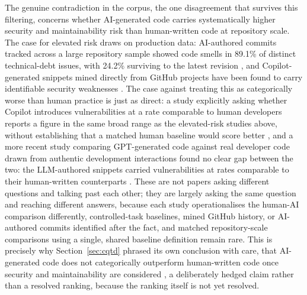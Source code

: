 The genuine contradiction in the corpus, the one disagreement that survives this filtering, concerns whether AI-generated code carries systematically higher security and maintainability risk than human-written code at repository scale. The case for elevated risk draws on production data: AI-authored commits tracked across a large repository sample showed code smells in 89.1\% of distinct technical-debt issues, with 24.2\% surviving to the latest revision \cite{liu_debt_2026}, and Copilot-generated snippets mined directly from GitHub projects have been found to carry identifiable security weaknesses \cite{fu_security_2025}. The case against treating this as categorically worse than human practice is just as direct: a study explicitly asking whether Copilot introduces vulnerabilities at a rate comparable to human developers reports a figure in the same broad range as the elevated-risk studies above, without establishing that a matched human baseline would score better \cite{asare_is_2024}, and a more recent study comparing GPT-generated code against real developer code drawn from authentic development interactions found no clear gap between the two: the LLM-authored snippets carried vulnerabilities at rates comparable to their human-written counterparts \cite{belozerov_secure_2026}. These are not papers asking different questions and talking past each other; they are largely asking the same question and reaching different answers, because each study operationalises the human-AI comparison differently, controlled-task baselines, mined GitHub history, or AI-authored commits identified after the fact, and matched repository-scale comparisons using a single, shared baseline definition remain rare. This is precisely why Section~\ref{sec:cqtd} phrased its own conclusion with care, that AI-generated code does not categorically outperform human-written code once security and maintainability are considered \cite{asare_is_2024,borg_echoes_2026}, a deliberately hedged claim rather than a resolved ranking, because the ranking itself is not yet resolved.

